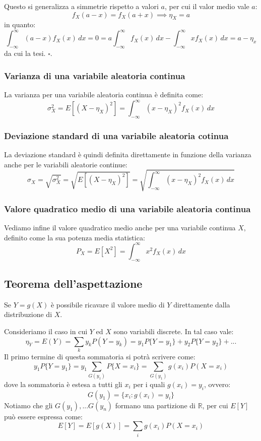 \documentclass[a4paper,11pt]{article}
\begin{document}
Questo si generalizza a simmetrie rispetto a valori $a$, per cui il valor medio vale $a$:
$$
f_X(a - x) = f_X(a + x) \implies \eta_X = a
$$
in quanto:
$$
\int_{-\infty}^{\infty} (a - x) f_X(x) \, dx = 0 = a \int_{-\infty}^\infty f_X(x) \, dx - \int_{-\infty}^{\infty} x f_X(x) \, dx = a - \eta_x
$$
da cui la tesi. \hfill $\square$.

\subsubsection{Varianza di una variabile aleatoria continua}
La varianza per una variabile aleatoria continua è definita come:
$$
\sigma^2_X = E \left[ (X - \eta_X)^2 \right] = \int_{-\infty}^{\infty} (x - \eta_X)^2 f_X (x) \, dx 
$$

\subsubsection{Deviazione standard di una variabile aleatoria cotinua}
La deviazione standard è quindi definita direttamente in funzione della varianza anche per le variabili aleatorie continue:
$$
\sigma_X = \sqrt{\sigma^2_X} = \sqrt{ E \left[ (X - \eta_X)^2 \right] } = \sqrt{ \int_{-\infty}^{\infty} (x - \eta_X)^2 f_X (x) \, dx }
$$

\subsubsection{Valore quadratico medio di una variabile aleatoria continua}
Vediamo infine il valore quadratico medio anche per una variabile continua $X$, definito come la sua potenza media statistica:
$$
P_X = E\left[ X^2 \right] = \int_{-\infty}^{\infty} x^2 f_X(x) \, dx
$$

\subsection{Teorema dell'aspettazione}
Se $Y = g(X)$ è possibile ricavare il valore medio di $Y$ direttamente dalla distribuzione di $X$.

Consideriamo il caso in cui $Y$ ed $X$ sono variabili discrete. In tal caso vale:
$$
\eta_Y = E(Y) = \sum_k y_k P(Y = y_k) = y_1 P \{ Y = y_1 \} + y_2 P \{ Y = y_2 \} + ...
$$
Il primo termine di questa sommatoria si potrà scrivere come:
$$
y_1 P \{ Y = y_1 \} = y_1 \sum_{G(y_1)} P \{ X = x_i \} = \sum_{G(y_1)} g(x_i) P(X = x_i)
$$
dove la sommatoria è estesa a tutti gli $x_i$ per i quali $g(x_i) = y_i$, ovvero:
$$
G(y_1) = \{ x_i : g(x_i) = y_i \}
$$
Notiamo che gli $G(y_1), ... G(y_n)$ formano una partizione di $\mathbb{R}$, per cui $E\left[Y\right]$ può essere espressa come:
$$
E\left[Y\right] = E\left[g(X)\right] = \sum_i g(x_i) P(X = x_i)
$$
\end{document}
